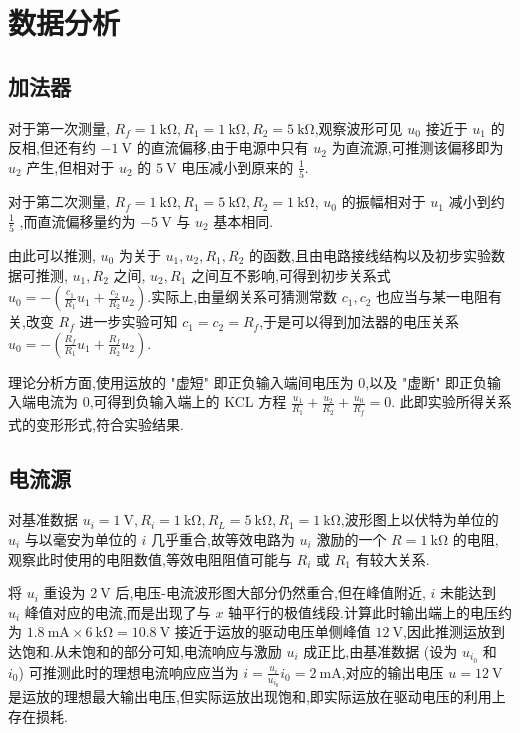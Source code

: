     \section{数据分析}
        \subsection{加法器}
        对于第一次测量, $R_{f}=1 \ \mathrm{k\Omega},R_1=1 \ \mathrm{k\Omega},R_2=5 \ \mathrm{k\Omega}$,观察波形可见 $u_0$ 接近于 $u_1$ 的反相,但还有约 $-1 \ \mathrm{V}$ 的直流偏移,由于电源中只有 $u_2$ 为直流源,可推测该偏移即为 $u_2$ 产生,但相对于 $u_2$ 的 $5 \ \mathrm{V}$ 电压减小到原来的 $\frac{1}{5}$.

        对于第二次测量, $R_{f}=1 \ \mathrm{k\Omega},R_1=5 \ \mathrm{k\Omega},R_2=1 \ \mathrm{k\Omega}$, $u_0$ 的振幅相对于 $u_1$ 减小到约 $\frac{1}{5}$ ,而直流偏移量约为 $-5 \ \mathrm{V}$ 与 $u_2$ 基本相同.

        由此可以推测, $u_0$ 为关于 $u_1,u_2,R_1,R_2$ 的函数,且由电路接线结构以及初步实验数据可推测, $u_1,R_2$ 之间, $u_2,R_1$ 之间互不影响,可得到初步关系式 $u_0=-\left( \frac{c_1}{R_1}u_1+\frac{c_2}{R_2}u_2 \right) $.实际上,由量纲关系可猜测常数 $c_1,c_2$ 也应当与某一电阻有关,改变 $R_{f}$ 进一步实验可知 $c_1=c_2=R_{f}$,于是可以得到加法器的电压关系 $u_0=-\left( \frac{R_{f}}{R_1}u_1+\frac{R_{f}}{R_2}u_2 \right) $.

        理论分析方面,使用运放的 "虚短" 即正负输入端间电压为 $0$,以及 "虚断" 即正负输入端电流为 $0$,可得到负输入端上的 KCL 方程 $\frac{u_1}{R_1}+\frac{u_2}{R_2}+\frac{u_0}{R_{f}}=0$. 此即实验所得关系式的变形形式,符合实验结果.
        \subsection{电流源}
        对基准数据 $u_{i}=1 \ \mathrm{V},R_i=1 \ \mathrm{k\Omega},R_{L}=5 \ \mathrm{k\Omega}, R_1=1 \ \mathrm{k\Omega}$,波形图上以伏特为单位的 $u_{i}$ 与以毫安为单位的 $i$ 几乎重合,故等效电路为 $u_{i}$ 激励的一个 $R=1 \ \mathrm{k\Omega}$ 的电阻,观察此时使用的电阻数值,等效电阻阻值可能与 $R_{i}$ 或 $R_{1}$ 有较大关系.

        将 $u_{i}$ 重设为 $2 \ \mathrm{V}$ 后,电压-电流波形图大部分仍然重合,但在峰值附近, $i$ 未能达到 $u_{i}$ 峰值对应的电流,而是出现了与 $x$ 轴平行的极值线段.计算此时输出端上的电压约为 $1.8 \ \mathrm{mA}\times 6 \ \mathrm{k\Omega}=10.8 \ \mathrm{V}$ 接近于运放的驱动电压单侧峰值 $12 \ \mathrm{V}$,因此推测运放到达饱和.从未饱和的部分可知,电流响应与激励 $u_{i}$ 成正比,由基准数据 (设为 $u_{i_0}$ 和 $i_0$) 可推测此时的理想电流响应应当为 $i=\frac{u_{i}}{u_{i_0}}i_{0}=2 \ \mathrm{mA}$,对应的输出电压 $u=12 \ \mathrm{V}$ 是运放的理想最大输出电压,但实际运放出现饱和,即实际运放在驱动电压的利用上存在损耗.

